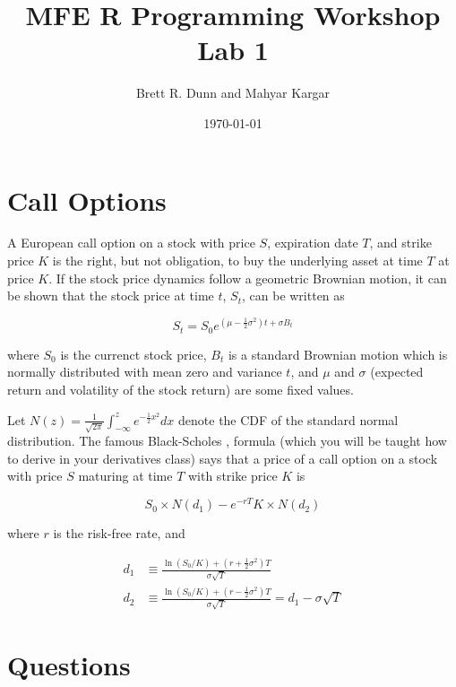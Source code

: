 \documentclass[12pt]{article}
\title{MFE R Programming Workshop Lab 1}
\date{\today}
\author{Brett R. Dunn and Mahyar Kargar}
\begin{document}
\maketitle
\onehalfspacing
\section*{Call Options}
A European call option on a stock with price $S$, expiration date $T$, and strike price $K$
is the right, but not obligation, to buy the underlying asset at time $T$ at price $K$. 
If the stock price dynamics follow a geometric Brownian motion, it can be shown that the stock price at time $t$, $S_t$, can be written as

\[
S_t = S_0 e^{\left(\mu-\frac{1}{2} \sigma^2 \right) t + \sigma B_t}
\]

where $S_0$ is the currenct stock price, $B_t$ is a standard Brownian motion which is normally distributed with mean zero and variance $t$, and $\mu$ and
$\sigma$ (expected return and volatility of the stock return) are some fixed values.

Let $N(z) = \frac{1}{\sqrt{2 \pi}} \int_{-\infty}^z e^{-\frac{1}{2}
  x^2}dx$ denote the CDF of the standard normal distribution. The
famous Black-Scholes \citep{black1973pricing,merton1973theory},
formula (which you will be taught how to
derive in your derivatives class) says that a price of a call option
on a stock with price $S$ maturing at time $T$ with strike price $K$ is

\[
S_0 \times N(d_1) - e^{-rT} K \times N(d_2)
\]

where $r$ is the risk-free rate, and

\begin{align*}
  d_1 &\equiv \frac{\ln(S_0 / K) + \left(r + \frac{1}{2} \sigma^2 \right)
    T}{\sigma \sqrt{T}} \\
  d_2 &\equiv \frac{\ln(S_0 / K) + \left(r - \frac{1}{2} \sigma^2 \right)
    T}{\sigma \sqrt{T}} = d_1-\sigma\sqrt{T}
\end{align*}

\section*{Questions}
\end{document}
